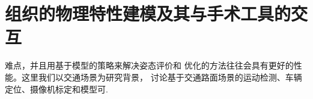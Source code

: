 \chapter{组织的物理特性建模及其与手术工具的交互}
\label{chap7}

难点，并且用基于模型的策略来解决姿态评价和
优化的方法往往会具有更好的性能。这里我们以交通场景为研究背景，
讨论基于交通路面场景的运动检测、车辆定位、摄像机标定和模型可. 